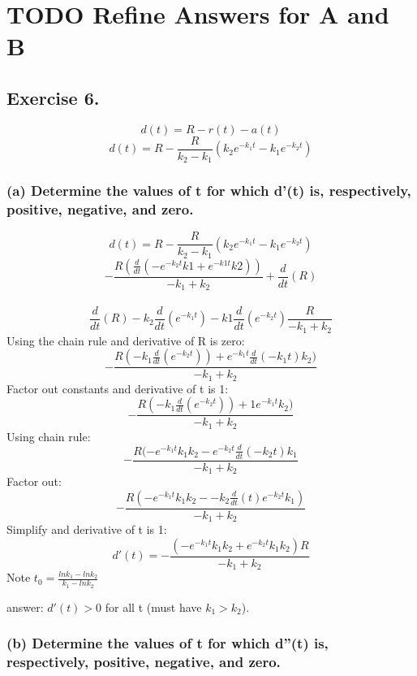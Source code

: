 \documentclass[]{article}
\begin{document}
\section{TODO Refine Answers for A and
B}\label{todo-refine-answers-for-a-and-b-1}

\subsection{Exercise 6.}\label{exercise-6.}

\[d(t) = R - r(t) - a(t)\]
\[d(t) = R - \frac{R}{k_2 - k_1}(k_2 e ^{-k_1 t} - k_1 e^{-k_2 t})\]

\subsubsection{(a) Determine the values of t for which d'(t) is,
respectively, positive, negative, and
zero.}\label{a-determine-the-values-of-t-for-which-dt-is-respectively-positive-negative-and-zero.}

\[d(t) = R - \frac{R}{k_2 - k_1}(k_2 e ^{-k_1 t} - k_1 e^{-k_2 t})\]
\[- \frac{R (\frac{d}{dt} (-e^{-k_2 t} k1 + e^{-k1t}k2))}{-k_1 + k_2} + \frac{d}{dt} (R)\]\\
\[\frac{d}{dt}(R) - k_2 \frac{d}{dt}(e^{-k_1 t})-k1\frac{d}{dt}(e^{-k_2 t})\frac{R}{-k_1 + k_2}\]
Using the chain rule and derivative of R is zero:
\[- \frac{R(-k_1 \frac{d}{dt}(e^{-k_2 t})) + e^{-k_1 t}\frac{d}{dt}(-k_1 t)k_2)}{-k_1 + k_2}\]
Factor out constants and derivative of t is 1:
\[- \frac{R(-k_1 \frac{d}{dt}(e^{-k_2 t})) + 1e^{-k_1 t}k_2)}{-k_1 + k_2}\]
Using chain rule:
\[- \frac{R(-e^{-k_1 t}k_1 k_2 - e^{-k_2 t} \frac{d}{dt} (-k_2 t)k_1}{-k_1 + k_2}\]
Factor out:
\[- \frac{R(-e^{-k_1 t}k_1 k_2 - -k_2 \frac{d}{dt}(t)e^{-k_2 t}k_1)}{-k_1 + k_2}\]
Simplify and derivative of t is 1:
\[d'(t) = -\frac{(-e^{-k_1 t}k_1 k_2 + e^{-k_2 t}k_1 k_2)R}{-k_1 + k_2}\]
Note \(t_0 = \frac{ln k_1 - ln k_2}{k_1 - lnk_2}\)

answer: \(d'(t) > 0\) for all t (must have \(k_1 > k_2\)).

\subsubsection{(b) Determine the values of t for which d''(t) is,
respectively, positive, negative, and
zero.}\label{b-determine-the-values-of-t-for-which-dt-is-respectively-positive-negative-and-zero.}
\end{document}
